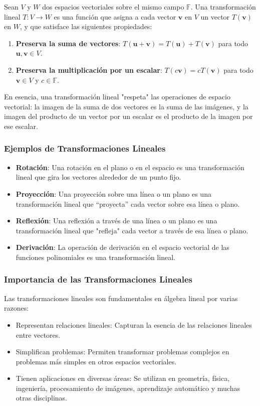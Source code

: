 Sean $V$ y $W$ dos espacios vectoriales sobre el mismo campo $\mathbb{F}$.  Una transformación lineal $T: V \rightarrow W$ es una función que asigna a cada vector $\mathbf{v}$ en $V$ un vector $T(\mathbf{v})$ en $W$, y que satisface las siguientes propiedades:

\begin{enumerate}
	\item \textbf{Preserva la suma de vectores}:  $T(\mathbf{u} + \mathbf{v}) = T(\mathbf{u}) + T(\mathbf{v})$ para todo $\mathbf{u}, \mathbf{v} \in V$.
	
	\item \textbf{Preserva la multiplicación por un escalar}: $T(c\mathbf{v}) = cT(\mathbf{v})$ para todo $\mathbf{v} \in V$ y $c \in \mathbb{F}$.
\end{enumerate}

En esencia, una transformación lineal "respeta" las operaciones de espacio vectorial: la imagen de la suma de dos vectores es la suma de las imágenes, y la imagen del producto de un vector por un escalar es el producto de la imagen por ese escalar.

\subsubsection{Ejemplos de Transformaciones Lineales}

\begin{itemize}
	\item \textbf{Rotación}: Una rotación en el plano o en el espacio es una transformación lineal que gira los vectores alrededor de un punto fijo.
	\item \textbf{Proyección}:  Una proyección sobre una línea o un plano es una transformación lineal que ``proyecta'' cada vector sobre esa línea o plano.
	\item \textbf{Reflexión}:  Una reflexión a través de una línea o un plano es una transformación lineal que "refleja" cada vector a través de esa línea o plano.
	\item \textbf{Derivación}: La operación de derivación en el espacio vectorial de las funciones polinomiales es una transformación lineal.
\end{itemize}

\subsubsection{Importancia de las Transformaciones Lineales}

Las transformaciones lineales son fundamentales en álgebra lineal por varias razones:
\begin{itemize}
	\item Representan relaciones lineales:  Capturan la esencia de las relaciones lineales entre vectores.
	\item Simplifican problemas: Permiten transformar problemas complejos en problemas más simples en otros espacios vectoriales.
	\item Tienen aplicaciones en diversas áreas: Se utilizan en geometría, física, ingeniería, procesamiento de imágenes, aprendizaje automático y muchas otras disciplinas.
\end{itemize}

